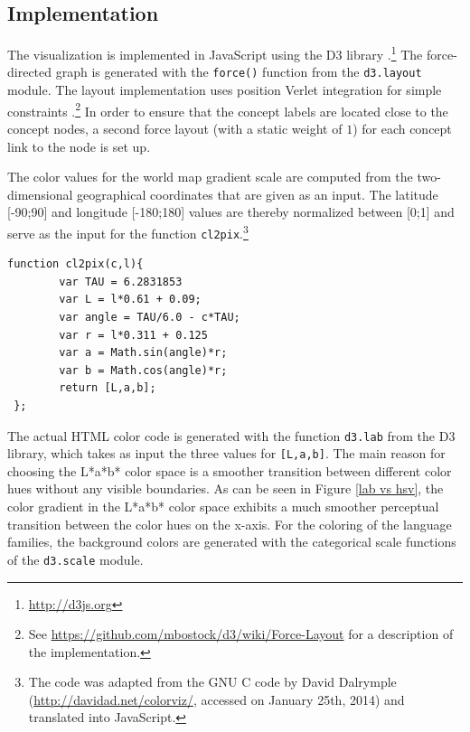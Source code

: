 


\subsection{Implementation}

The visualization is implemented in JavaScript using the D3 library \cite{D3}.\footnote{\url{http://d3js.org}} The force-directed graph is  generated with the \texttt{force()} function from the \texttt{d3.layout} module. The layout implementation uses position Verlet integration for simple constraints \cite{Dwyer2009}.\footnote{See \url{https://github.com/mbostock/d3/wiki/Force-Layout} for a description of the implementation.} In order to ensure that the concept labels are located close to the concept nodes, a second force layout (with a static weight of $1$) for each concept link to the node is set up. 

The color values for the world map gradient scale are computed from the two-dimensional geographical coordinates that are given as an input. The latitude [-90;90] and longitude [-180;180] values are thereby normalized between [0;1] and serve as the input for the function \texttt{cl2pix}.\footnote{The code was adapted from the GNU C code by David Dalrymple (\url{http://davidad.net/colorviz/}, accessed on January 25th, 2014) and translated into JavaScript.}

\begin{verbatim}
function cl2pix(c,l){
   		var TAU = 6.2831853 
   		var L = l*0.61 + 0.09; 
   		var angle = TAU/6.0 - c*TAU;   
   		var r = l*0.311 + 0.125 
   		var a = Math.sin(angle)*r;
   		var b = Math.cos(angle)*r;
   		return [L,a,b];
 };
\end{verbatim}

The actual HTML color code is generated with the function \texttt{d3.lab} from the D3 library, which takes as input the three values for \texttt{[L,a,b]}. The main reason for choosing the L*a*b* color space is a smoother transition between different color hues without any visible boundaries. As can be seen in Figure \ref{lab vs hsv}, the color gradient in the L*a*b* color space exhibits a much smoother perceptual transition between the color hues on the x-axis. 
For the coloring of the language families, the background colors are generated with the categorical scale functions of the \texttt{d3.scale} module. 

